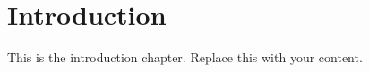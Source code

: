 \chapter{Introduction}\label{ch:introduction}

%
%
%
%
%
%

This is the introduction chapter. Replace this with your content.
